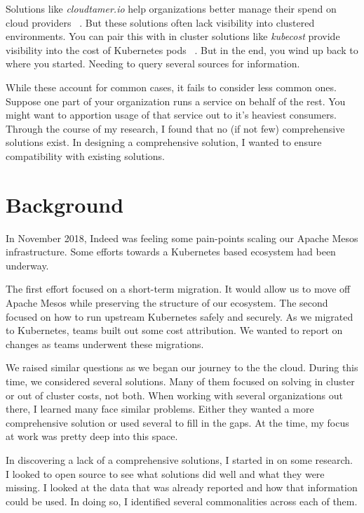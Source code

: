 \documentclass[10pt, a4paper, twocolumn]{article}
\begin{document}
  Solutions like \textit{cloudtamer.io} help organizations better manage their spend on cloud providers ~\cite{cloudtamer}.
  But these solutions often lack visibility into clustered environments.
  You can pair this with in cluster solutions like \textit{kubecost} provide visibility into the cost of Kubernetes pods ~\cite{kubecost}.
  But in the end, you wind up back to where you started.
  Needing to query several sources for information.

  While these account for common cases, it fails to consider less common ones.
  Suppose one part of your organization runs a service on behalf of the rest.
  You might want to apportion usage of that service out to it's heaviest consumers.
  Through the course of my research, I found that no (if not few) comprehensive solutions exist.
  In designing a comprehensive solution, I wanted to ensure compatibility with existing solutions.


\section*{Background}
  In November 2018, Indeed was feeling some pain-points scaling our Apache Mesos infrastructure.
  Some efforts towards a Kubernetes based ecosystem had been underway.

  The first effort focused on a short-term migration.
  It would allow us to move off Apache Mesos while preserving the structure of our ecosystem.
  The second focused on how to run upstream Kubernetes safely and securely.
  As we migrated to Kubernetes, teams built out some cost attribution.
  We wanted to report on changes as teams underwent these migrations.

  We raised similar questions as we began our journey to the the cloud.
  During this time, we considered several solutions.
  Many of them focused on solving in cluster or out of cluster costs, not both.
  When working with several organizations out there, I learned many face similar problems.
  Either they wanted a more comprehensive solution or used several to fill in the gaps.
  At the time, my focus at work was pretty deep into this space.

  In discovering a lack of a comprehensive solutions, I started in on some research.
  I looked to open source to see what solutions did well and what they were missing.
  I looked at the data that was already reported and how that information could be used.
  In doing so, I identified several commonalities across each of them.
\end{document}
